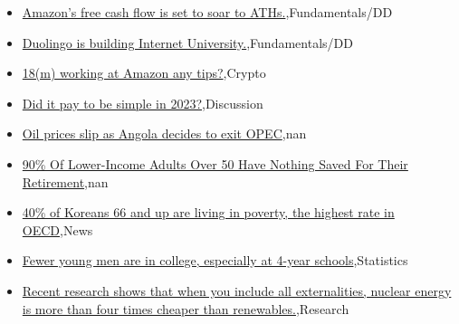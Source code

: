 \documentclass{article}%
\begin{document}
%
\begin{itemize}%
\item%
\href{https://reddit.com/r/StockMarket/comments/18od2mo/amazons\_free\_cash\_flow\_is\_set\_to\_soar\_to\_aths/}{Amazon's free cash flow is set to soar to ATHs.},Fundamentals/DD%
\item%
\href{https://reddit.com/r/StockMarket/comments/18ocoxu/duolingo\_is\_building\_internet\_university/}{Duolingo is building Internet University.},Fundamentals/DD%
\item%
\href{https://reddit.com/r/StockMarket/comments/18o3k24/18m\_working\_at\_amazon\_any\_tips/}{18(m) working at Amazon any tips?},Crypto%
\item%
\href{https://reddit.com/r/StockMarket/comments/18o2lt6/did\_it\_pay\_to\_be\_simple\_in\_2023/}{Did it pay to be simple in 2023?},Discussion%
\item%
\href{https://reddit.com/r/Economics/comments/18o2jso/oil\_prices\_slip\_as\_angola\_decides\_to\_exit\_opec/}{Oil prices slip as Angola decides to exit OPEC},nan%
\item%
\href{https://reddit.com/r/Economics/comments/18nzlmx/90\_of\_lowerincome\_adults\_over\_50\_have\_nothing/}{90\% Of Lower-Income Adults Over 50 Have Nothing Saved For Their Retirement},nan%
\item%
\href{https://reddit.com/r/Economics/comments/18nze6w/40\_of\_koreans\_66\_and\_up\_are\_living\_in\_poverty\_the/}{40\% of Koreans 66 and up are living in poverty, the highest rate in OECD},News%
\item%
\href{https://reddit.com/r/Economics/comments/18nwaun/fewer\_young\_men\_are\_in\_college\_especially\_at/}{Fewer young men are in college, especially at 4-year schools},Statistics%
\item%
\href{https://reddit.com/r/Economics/comments/18nvtzq/recent\_research\_shows\_that\_when\_you\_include\_all/}{Recent research shows that when you include all externalities, nuclear energy is more than four times cheaper than renewables.},Research%
\end{itemize}%
\end{document}
